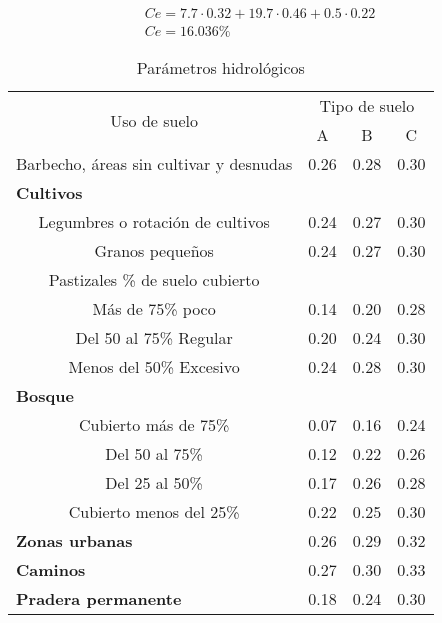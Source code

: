       \begin{align*}
        Ce = 7.7\cdot 0.32 +19.7\cdot 0.46 + 0.5\cdot 0.22\\
        Ce =16.036\%
      \end{align*}
      \begin{table}[h!]
        \centering\begin{tabular}{@{}cccc@{}}
        \toprule
        \multirow{2}{*}{Uso de suelo}                   & \multicolumn{3}{c}{Tipo de suelo} \\
                                                        & A         & B         & C         \\ \midrule
        Barbecho, áreas sin cultivar y desnudas         & 0.26      & 0.28      & 0.30      \\
        \multicolumn{1}{l}{\textbf{Cultivos}}           &           &           &           \\
        Legumbres o rotación de cultivos                & 0.24      & 0.27      & 0.30      \\
        Granos pequeños                                 & 0.24      & 0.27      & 0.30      \\
        Pastizales \% de suelo cubierto                 &           &           &           \\
        Más de 75\% poco                                & 0.14      & 0.20      & 0.28      \\
        Del 50 al 75\% Regular                          & 0.20      & 0.24      & 0.30      \\
        Menos del 50\% Excesivo                         & 0.24      & 0.28      & 0.30      \\
        \multicolumn{1}{l}{\textbf{Bosque}}             &           &           &           \\
        Cubierto más de 75\%                            & 0.07      & 0.16      & 0.24      \\
        Del 50 al 75\%                                  & 0.12      & 0.22      & 0.26      \\
        Del 25 al 50\%                                  & 0.17      & 0.26      & 0.28      \\
        Cubierto menos del 25\%                         & 0.22      & 0.25      & 0.30      \\
        \multicolumn{1}{l}{\textbf{Zonas urbanas}}      & 0.26      & 0.29      & 0.32      \\
        \multicolumn{1}{l}{\textbf{Caminos}}            & 0.27      & 0.30      & 0.33      \\
        \multicolumn{1}{l}{\textbf{Pradera permanente}} & 0.18      & 0.24      & 0.30      \\ \bottomrule
        \end{tabular}
        \caption{Parámetros hidrológicos }
        \label{tabta18}
        \end{table}
